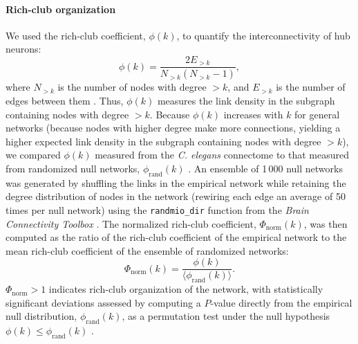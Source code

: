 \documentclass[10pt,letterpaper]{article}
\begin{document}
\paragraph{Rich-club organization}
We used the rich-club coefficient, $\phi(k)$, to quantify the interconnectivity of hub neurons:
\begin{equation}
    \label{eqn:rich_club}
    \phi(k) = \frac{2E_{>k}}{N_{>k}(N_{>k}-1)},
\end{equation}
where $N_{>k}$ is the number of nodes with degree $>k$, and $E_{>k}$ is the number of edges between them  \cite{Colizza:2006kz}.
Thus, $\phi(k)$ measures the link density in the subgraph containing nodes with degree $>k$.
Because $\phi(k)$ increases with $k$ for general networks (because nodes with higher degree make more connections, yielding a higher expected link density in the subgraph containing nodes with degree $>k$), we compared $\phi(k)$ measured from the \emph{C. elegans} connectome to that measured from randomized null networks, $\phi_\mathrm{rand}(k)$ \cite{Colizza:2006kz}.
An ensemble of 1\,000 null networks was generated by shuffling the links in the empirical network while retaining the degree distribution of nodes in the network \cite{Maslov:2002hi} (rewiring each edge an average of 50 times per null network) using the \texttt{randmio\_dir} function from the {\it Brain Connectivity Toolbox} \cite{Rubinov:2010jd}.
The normalized rich-club coefficient, $\Phi_\mathrm{norm}(k)$, was then computed as the ratio of the rich-club coefficient of the empirical network to the mean rich-club coefficient of the ensemble of randomized networks:
\begin{equation}
    \label{eqn:rich_club_norm}
    \Phi_\mathrm{norm}(k) = \frac{\phi(k)}{\langle \phi_\mathrm{rand}(k) \rangle}.
\end{equation}
$\Phi_\mathrm{norm} > 1$ indicates rich-club organization of the network, with statistically significant deviations assessed by computing a $P$-value directly from the empirical null distribution, $\phi_\mathrm{rand}(k)$, as a permutation test under the null hypothesis $\phi(k) \leq \phi_\mathrm{rand}(k)$ \cite{vandenHeuvel:2011he}.

\end{document}
